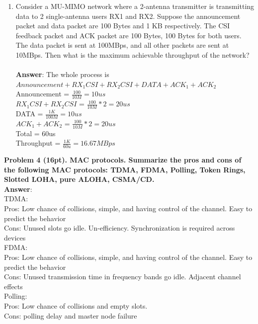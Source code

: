 \documentclass[12pt]{article}
\begin{document}
\begin{enumerate}
\item  Consider a MU-MIMO network where a 2-antenna transmitter is transmitting data to 2
single-antenna users RX1 and RX2. Suppose the announcement packet and data packet are 100
Bytes and 1 KB respectively. The CSI feedback packet and ACK packet are 100 Bytes, 100
Bytes for both users. The data packet is sent at 100MBps, and all other packets are sent at
10MBps. Then what is the maximum achievable throughput of the network? \\\\
\textbf{Answer}: The whole process is $Announcement + RX_1 CSI + RX_2 CSI + DATA + ACK_1 + ACK_2$\\
Announcement = $\frac{100}{10M} = 10us$\\
$RX_1 CSI + RX_2 CSI$ = $\frac{100}{10M} *2 = 20us$\\
DATA = $\frac{1K}{100M} = 10us$\\
$ACK_1 + ACK_2 $ = $\frac{100}{10M} *2 = 20us$\\
Total = 60us\\
Throughput = $\frac{1K}{60u} = 16.67 MBps$\\

\end{enumerate}

\noindent \textbf{Problem 4 (16pt). MAC protocols. Summarize the pros and cons of the following MAC protocols: TDMA, FDMA, Polling, Token Rings, Slotted LOHA, pure ALOHA, CSMA/CD.\\}
\textbf{Answer}:\\
TDMA:\\
Pros: Low chance of collisions, simple, and having control of the channel. Easy to predict the behavior\\
Cons: Unused slots go idle. Un-efficiency. Synchronization is required across devices\\

\noindent FDMA:\\
Pros: Low chance of collisions, simple, and having control of the channel. Easy to predict the behavior \\
Cons: Unused transmission time in frequency bands go idle. Adjacent channel effects\\

\noindent Polling:\\
Pros: Low chance of collisions and empty slots.\\
Cons: polling delay and master node failure\\
\end{document}
